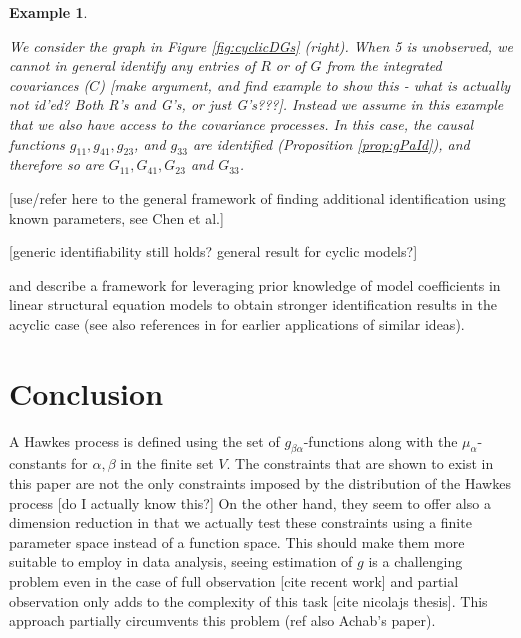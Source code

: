 \documentclass[accepted]{uai2021} %
\newtheorem{exmp}[thm]{Example}
\begin{document}
\begin{exmp}
\begin{figure*}
\begin{subfigure}{0.48\linewidth}
\begin{tikzpicture}[scale=0.7]
			
			\end{tikzpicture}
		\end{subfigure}
		\caption{\label{fig:cyclicDGs} Loops (self-edges) are omitted from this 
		vizualiation. Circles represent observed coordinate processes and 
		squares represent unobserved processes. Left: . Right: }
	\end{figure*}
	
	We consider the graph in Figure \ref{fig:cyclicDGs} (right). When 5 is 
	unobserved, we cannot in general identify any entries of $R$ or of $G$ from 
	the integrated covariances ($C$) [make argument, and find example to show 
	this - what is actually not id'ed? Both R's and G's, or just G's???]. 
	Instead we assume in this example that we also have access to the 
	covariance processes. In this case, the causal functions 
	$g_{11},g_{41},g_{23}$, and $g_{33}$ are identified (Proposition 
	\ref{prop:gPaId}), and therefore so are $G_{11}, G_{41} , G_{23}$ and 
	$G_{33}$.
\end{exmp}

[use/refer here to the general framework of finding additional identification 
using known parameters, see Chen et al.]

[generic identifiability still holds? general result for cyclic models?]

\cite{chenIJCAI2016} and \cite{chenICML2017} describe a framework for 
leveraging prior knowledge of 
model coefficients in linear structural equation models to obtain stronger 
identification results in the acyclic case (see also references in 
\cite{chenICML2017} for earlier applications of similar ideas).



\section{Conclusion}

A Hawkes process is defined using the set of $g_{\beta\alpha}$-functions along 
with the $\mu_\alpha$-constants for $\alpha,\beta$ in the finite set $V$. The 
constraints that are shown to exist in this paper are not the only constraints 
imposed by the distribution of the Hawkes process [do I actually know this?] On 
the other hand, they seem to offer also a dimension reduction in that we 
actually test these constraints using a finite parameter space instead of a 
function space. This should make them more suitable to employ in data analysis, 
seeing estimation of $g$ is a challenging problem even in the case of full 
observation [cite recent work] and partial observation only adds to the 
complexity of this task [cite nicolajs thesis]. This approach partially 
circumvents this problem (ref also Achab's paper).
\end{document}
